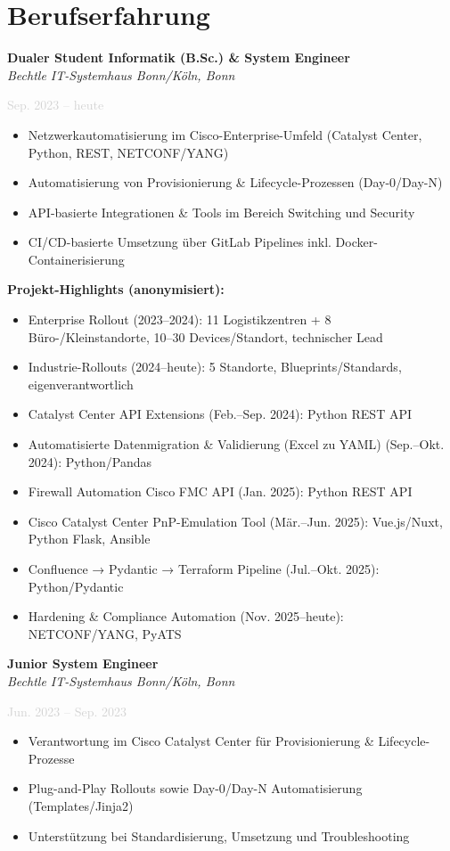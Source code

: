 \documentclass[11pt,a4paper]{article}
\newcommand{\cventry}[5]{
    \noindent
    \begin{minipage}[t]{0.75\textwidth}
        \textbf{#1}\\
        \textit{#2}
    \end{minipage}
    \hfill
    \begin{minipage}[t]{0.23\textwidth}
        \raggedleft\textcolor{lightgray}{#3}
    \end{minipage}
    \par\vspace{2pt}
    \noindent\textcolor{lightgray}{#4}
    \par\vspace{4pt}
    #5
    \par\vspace{8pt}
}
\begin{document}
\vspace{10pt}

\section*{Berufserfahrung}

\cventry{Dualer Student Informatik (B.Sc.) \& System Engineer}{Bechtle IT-Systemhaus Bonn/Köln, Bonn}{Sep. 2023 – heute}{}{
\begin{itemize}
    \item Netzwerkautomatisierung im Cisco-Enterprise-Umfeld (Catalyst Center, Python, REST, NETCONF/YANG)
    \item Automatisierung von Provisionierung \& Lifecycle-Prozessen (Day-0/Day-N)
    \item API-basierte Integrationen \& Tools im Bereich Switching und Security
    \item CI/CD-basierte Umsetzung über GitLab Pipelines inkl. Docker-Containerisierung
\end{itemize}
\textbf{Projekt-Highlights (anonymisiert):}
\begin{itemize}
    \item Enterprise Rollout (2023–2024): 11 Logistikzentren + 8 Büro-/Kleinstandorte, 10–30 Devices/Standort, technischer Lead
    \item Industrie-Rollouts (2024–heute): 5 Standorte, Blueprints/Standards, eigenverantwortlich
    \item Catalyst Center API Extensions (Feb.–Sep. 2024): Python REST API
    \item Automatisierte Datenmigration \& Validierung (Excel zu YAML) (Sep.–Okt. 2024): Python/Pandas
    \item Firewall Automation Cisco FMC API (Jan. 2025): Python REST API
    \item Cisco Catalyst Center PnP-Emulation Tool (Mär.–Jun. 2025): Vue.js/Nuxt, Python Flask, Ansible
    \item Confluence → Pydantic → Terraform Pipeline (Jul.–Okt. 2025): Python/Pydantic
    \item Hardening \& Compliance Automation (Nov. 2025–heute): NETCONF/YANG, PyATS
\end{itemize}
}

\cventry{Junior System Engineer}{Bechtle IT-Systemhaus Bonn/Köln, Bonn}{Jun. 2023 – Sep. 2023}{}{
\begin{itemize}
    \item Verantwortung im Cisco Catalyst Center für Provisionierung \& Lifecycle-Prozesse
    \item Plug-and-Play Rollouts sowie Day-0/Day-N Automatisierung (Templates/Jinja2)
    \item Unterstützung bei Standardisierung, Umsetzung und Troubleshooting
\end{itemize}
}
\end{document}
